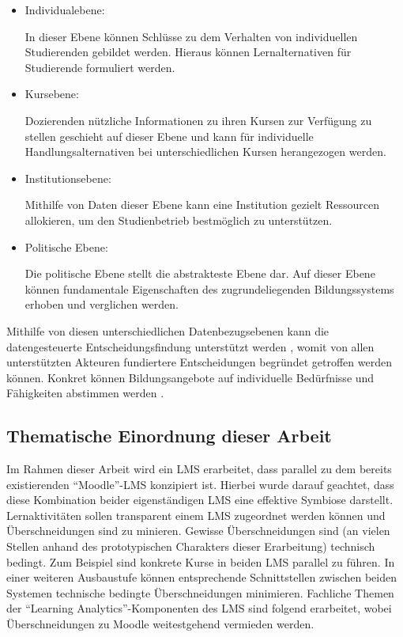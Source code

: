 \begin{itemize}
	\item Individualebene: 
	
		In dieser Ebene können Schlüsse zu dem Verhalten von individuellen Studierenden gebildet werden. Hieraus können Lernalternativen für Studierende formuliert werden.
		
	\item Kursebene:
	
		Dozierenden nützliche Informationen zu ihren Kursen zur Verfügung zu stellen geschieht auf dieser Ebene und kann für individuelle Handlungsalternativen bei unterschiedlichen Kursen herangezogen werden. 
	
	\item Institutionsebene:
	
		Mithilfe von Daten dieser Ebene kann eine Institution gezielt Ressourcen allokieren, um den Studienbetrieb bestmöglich zu unterstützen.  
	
	\item Politische Ebene:
	
		Die politische Ebene stellt die abstrakteste Ebene dar. Auf dieser Ebene können fundamentale Eigenschaften des zugrundeliegenden Bildungssystems erhoben und verglichen werden.
	
\end{itemize}

Mithilfe von diesen unterschiedlichen Datenbezugsebenen kann die datengesteuerte Entscheidungsfindung unterstützt werden \autocite[S.19]{theEvolutionOfBigDataAndLearningAnalyticsInAmericanHigherEducation}, womit von allen unterstützten Akteuren fundiertere Entscheidungen begründet getroffen werden können. Konkret können Bildungsangebote auf individuelle Bedürfnisse und Fähigkeiten abstimmen werden \autocite[S.26]{2012HorizonReport}.






\subsection{Thematische Einordnung dieser Arbeit}


Im Rahmen dieser Arbeit wird ein \ac{LMS} erarbeitet, dass parallel zu dem bereits existierenden \enquote{Moodle}-\ac{LMS} konzipiert ist. Hierbei wurde darauf geachtet, dass diese Kombination beider eigenständigen \ac{LMS} eine effektive Symbiose darstellt. Lernaktivitäten sollen transparent einem \ac{LMS} zugeordnet werden können und Überschneidungen sind zu minieren. Gewisse Überschneidungen sind (an vielen Stellen anhand des prototypischen Charakters dieser Erarbeitung) technisch bedingt. Zum Beispiel sind konkrete Kurse in beiden \ac{LMS} parallel zu führen. In einer weiteren Ausbaustufe können entsprechende Schnittstellen zwischen beiden Systemen technische bedingte Überschneidungen minimieren. Fachliche Themen der \enquote{Learning Analytics}-Komponenten des \ac{LMS} sind folgend erarbeitet, wobei Überschneidungen zu Moodle weitestgehend vermieden werden. 

